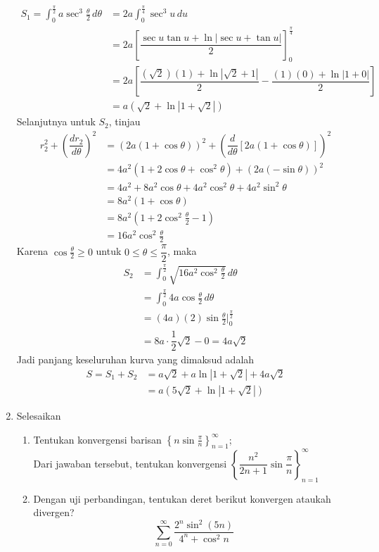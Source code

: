 \documentclass{article}
\begin{document}
\begin{enumerate}
\begin{align*}
S_1 = \int_0^\frac{\pi}{2} a\sec^3\frac{\theta}{2}\, d\theta &= 2a\int_0^\frac{\pi}{4}\sec^3 u \, du\\
&= 2a\left[\dfrac{\sec u\tan u+\ln |\sec u+\tan u|}{2}\right]^\frac{\pi}{4}_0\\
&= 2a\left[\dfrac{(\sqrt{2})(1)+\ln|\sqrt{2}+1|}{2}-\dfrac{(1)(0)+\ln|1+0|}{2}\right]\\
&= a(\sqrt{2}+\ln|1+\sqrt{2}|)
\end{align*}
Selanjutnya untuk $S_2$, tinjau
\begin{align*}
r_2^2+\left(\dfrac{dr_2}{d\theta}\right)^2 &= (2a(1+\cos\theta))^2+\left(\dfrac{d}{d\theta}[2a(1+\cos\theta)]\right)^2\\
&= 4a^2(1+2\cos\theta +\cos^2\theta)+\left(2a(-\sin\theta)\right)^2\\
&= 4a^2+8a^2\cos\theta +4a^2\cos^2\theta+4a^2\sin^2\theta\\
&= 8a^2(1+\cos\theta)\\
&= 8a^2(1+2\cos^2\frac{\theta}{2}-1)\\
&= 16a^2\cos^2\frac{\theta}{2}
\end{align*}
Karena $\cos\frac{\theta}{2}\geq 0$ untuk $0\leq \theta\leq \dfrac{\pi}{2}$, maka
\begin{align*}
S_2 &= \int_0^\frac{\pi}{2}\sqrt{16a^2\cos^2\frac{\theta}{2}}\, d\theta\\
&= \int_0^\frac{\pi}{2}4a\cos\frac{\theta}{2}\, d\theta\\
&= (4a)(2)\sin\frac{\theta}{2}\Big|^\frac{\pi}{2}_0\\
&= 8a\cdot\dfrac{1}{2}\sqrt{2}-0 = 4a\sqrt{2}
\end{align*}
Jadi panjang keseluruhan kurva yang dimaksud adalah \begin{align*}
S=S_1+S_2 &= a\sqrt{2}+a\ln|1+\sqrt{2}|+4a\sqrt{2}\\
&= a(5\sqrt{2} +\ln|1+\sqrt{2}|)
\end{align*}
	\item Selesaikan 
	\begin{enumerate}
		\item Tentukan konvergensi barisan $\left\{ n\sin\frac{\pi}{n}\right\}^\infty_{n=1}$;\\
		Dari jawaban tersebut, tentukan konvergensi $\left\{ \dfrac{n^2}{2n+1}\sin\dfrac{\pi}{n}\right\}^\infty_{n=1}$
		\item Dengan uji perbandingan, tentukan deret berikut konvergen ataukah divergen?
		$$ \sum_{n=0}^\infty \dfrac{2^n\sin^2(5n)}{4^n+\cos^2 n} $$

\end{enumerate}
\end{enumerate}
\end{document}
